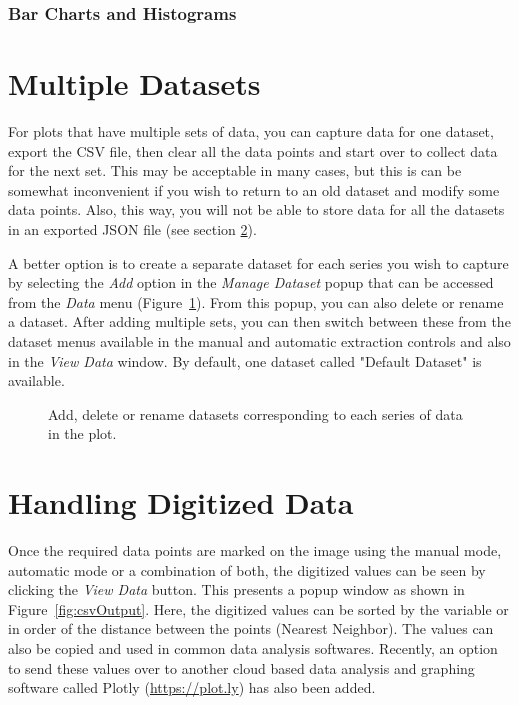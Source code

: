 \documentclass[letterpaper, 11pt]{article}
\begin{document}
\subsubsection{Bar Charts and Histograms}

\section{Multiple Datasets}
\label{sec:multipleDatasets}
For plots that have multiple sets of data, you can capture data for one dataset, export the CSV file, then clear all the data points and start over to collect data for the next set. This may be acceptable in many cases, but this is can be somewhat inconvenient if you wish to return to an old dataset and modify some data points. Also, this way, you will not be able to store data for all the datasets in an exported JSON file (see section \ref{sec:csvData}). 

A better option is to create a separate dataset for each series you wish to capture by selecting the \emph{Add} option in the \emph{Manage Dataset} popup that can be accessed from the \emph{Data} menu (Figure~\ref{fig:manageDatasets}). From this popup, you can also delete or rename a dataset. After adding multiple sets, you can then switch between these from the dataset menus available in the manual and automatic extraction controls and also in the \emph{View Data} window. By default, one dataset called "Default Dataset" is available.
\begin{figure}[h]
\begin{center}
\caption{Add, delete or rename datasets corresponding to each series of data in the plot.}
\label{fig:manageDatasets}
\end{center}
\end{figure}

 
\section{Handling Digitized Data}
\label{sec:csvData}
Once the required data points are marked on the image using the manual mode, automatic mode or a combination of both, the digitized values can be seen by clicking the \emph{View Data} button. This presents a popup window as shown in Figure~\ref{fig:csvOutput}. Here, the digitized values can be sorted by the variable or in order of the distance between the points (Nearest Neighbor). The values can also be copied and used in common data analysis softwares. Recently, an option to send these values over to another cloud based data analysis and graphing software called Plotly (\url{https://plot.ly}) has also been added.
 
\end{document}

